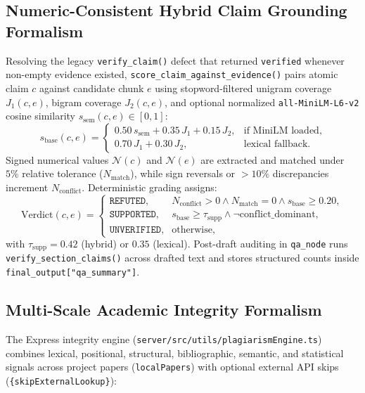 \documentclass[conference]{IEEEtran}
\begin{document}
\subsection{Numeric-Consistent Hybrid Claim Grounding Formalism}
Resolving the legacy \texttt{verify\_claim()} defect that returned \texttt{verified} whenever non-empty evidence existed, \texttt{score\_claim\_against\_evidence()} pairs atomic claim $c$ against candidate chunk $e$ using stopword-filtered unigram coverage $J_1(c, e)$, bigram coverage $J_2(c, e)$, and optional normalized \texttt{all-MiniLM-L6-v2} cosine similarity $s_{\text{sem}}(c, e) \in [0, 1]$:
\begin{equation}
s_{\text{base}}(c, e) =
\begin{cases}
0.50\,s_{\text{sem}} + 0.35\,J_1 + 0.15\,J_2, & \text{if MiniLM loaded},\\
0.70\,J_1 + 0.30\,J_2, & \text{lexical fallback}.
\end{cases}
\end{equation}
Signed numerical values $\mathcal{N}(c)$ and $\mathcal{N}(e)$ are extracted and matched under $5\%$ relative tolerance ($N_{\text{match}}$), while sign reversals or $>10\%$ discrepancies increment $N_{\text{conflict}}$. Deterministic grading assigns:
\begin{equation}
\text{Verdict}(c, e) =
\begin{cases}
\texttt{REFUTED}, & N_{\text{conflict}} > 0 \land N_{\text{match}} = 0 \land s_{\text{base}} \ge 0.20,\\
\texttt{SUPPORTED}, & s_{\text{base}} \ge \tau_{\text{supp}} \land \neg\text{conflict\_dominant},\\
\texttt{UNVERIFIED}, & \text{otherwise},
\end{cases}
\end{equation}
with $\tau_{\text{supp}} = 0.42$ (hybrid) or $0.35$ (lexical). Post-draft auditing in \texttt{qa\_node} runs \texttt{verify\_section\_claims()} across drafted text and stores structured counts inside \texttt{final\_output["qa\_summary"]}.

\subsection{Multi-Scale Academic Integrity Formalism}
The Express integrity engine (\texttt{server/src/utils/plagiarismEngine.ts}) combines lexical, positional, structural, bibliographic, semantic, and statistical signals across project papers (\texttt{localPapers}) with optional external API skips (\texttt{\{skipExternalLookup\}}):
\end{document}
